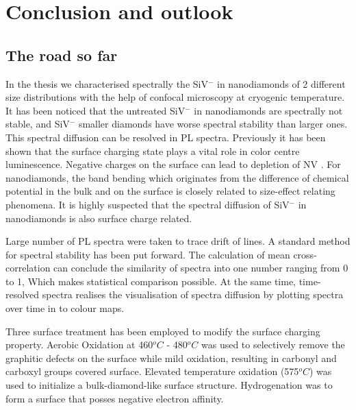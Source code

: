 \chapter{Conclusion and outlook} %

\label{Chapter3} %

\section{The road so far}

In the thesis we characterised spectrally the SiV$^{-}$ in nanodiamonds of 2 different size distributions with the help of confocal microscopy at cryogenic temperature. It has been noticed that the untreated SiV$^{-}$ in nanodiamonds are spectrally not stable, and SiV$^{-}$ smaller diamonds have worse spectral stability than larger ones. This spectral diffusion can be resolved in PL spectra. Previously it has been shown that the surface charging state plays a vital role in color centre luminescence. Negative charges on the surface can lead to depletion of NV \cite{stacey_depletion_2012}. For nanodiamonds, the band bending which originates from the difference of chemical potential in the bulk and on the surface is closely related to size-effect relating phenomena. It is highly suspected that the spectral diffusion of SiV$^{-}$ in nanodiamonds is also surface charge related.

Large number of PL spectra were taken to trace drift of lines. A standard method for spectral stability has been put forward. The calculation of mean cross-correlation can conclude the similarity of spectra into one number ranging from 0 to 1, Which makes statistical comparison possible. At the same time, time-resolved spectra realises the visualisation of spectra diffusion by plotting spectra over time in to colour maps.

Three surface treatment has been employed to modify the surface charging property. Aerobic Oxidation at 460$^{o}C$ - 480$^{o}C$ was used to selectively remove the graphitic defects on the surface while mild oxidation, resulting in carbonyl and carboxyl groups covered surface. Elevated temperature oxidation (575$^{o}C$) was used to initialize a bulk-diamond-like surface structure. Hydrogenation was to form a surface that posses negative electron affinity.

